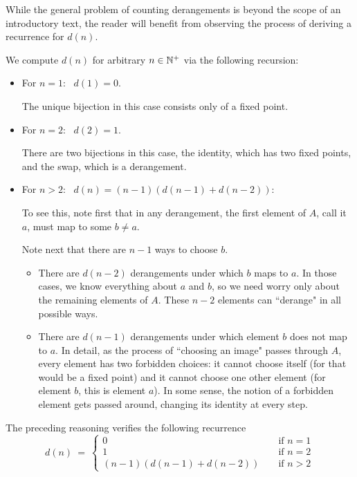 \smallskip

While the general problem of counting derangements is beyond the scope of an introductory text, the reader will benefit from observing the process of deriving a recurrence for $d(n)$.  

\medskip

We compute $d(n)$ for arbitrary $n \in \mathbb{N}^+$ via the following recursion:
\begin{itemize}
\item
For $n=1$:  \ $d(1) = 0$.

\smallskip

The unique bijection in this case consists only of a fixed point. 

\medskip\item
For $n=2$:  \ $d(2) = 1$.

\smallskip

There are two bijections in this case, the identity, which has two fixed points, and the swap,
which is a derangement.

\medskip\item
For $n > 2$: \ $d(n) = (n-1) (d(n-1) + d(n-2))$:

\smallskip

To see this, note first that in any derangement, the first element of $A$, call it $a$, must map to some $b \neq a$.

\smallskip

Note next that there are $n-1$ ways to choose $b$.
  \begin{itemize}
  \item
There are $d(n-2)$ derangements under which $b$ maps to $a$.  In those cases, we know everything about $a$ and $b$, so we need worry only about the remaining elements of $A$.  These $n-2$ elements can ``derange" in all possible ways.

  \medskip\item
There are $d(n-1)$ derangements under which element $b$ does not map to $a$.  In detail,
as the process of ``choosing an image" passes through $A$, every element has two forbidden
choices: it cannot choose itself (for that would be a fixed point) and it cannot choose one other
element (for element $b$, this is element $a$).  In some sense, the notion of a forbidden element gets passed around, changing its identity at every step.
  \end{itemize}
\end{itemize}
The preceding reasoning verifies the following recurrence
\[
d(n) \ = \ \left\{
\begin{array}{ccl}
0 &  & \mbox{ if } n=1 \\
1 &  & \mbox{ if } n= 2 \\
(n-1) (d(n-1) + d(n-2)) &  & \mbox{ if } n> 2
\end{array}
\right. 
\]

